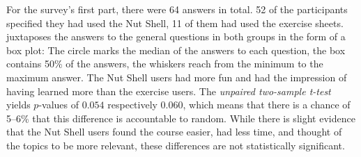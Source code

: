 \documentclass[paper=a4,twoside,abstract=on,cleardoublepage=empty,numbers=noenddot,toc=bib,toc=listof,12pt,appendixprefix=true]{scrreprt}
\begin{document}
For the survey's first part, there were 64 answers in total. 52 of the participants specified they had used the Nut Shell, 11 of them had used the exercise sheets.  juxtaposes the answers to the general questions in both groups in the form of a box plot: The circle marks the median of the answers to each question, the box contains 50\% of the answers, the whiskers reach from the minimum to the maximum answer. The Nut Shell users had more fun and had the impression of having learned more than the exercise users. The \emph{unpaired two-sample t-test} yields $p$-values of $0.054$ respectively $0.060$, which means that there is a chance of 5--6\% that this difference is accountable to random. While there is slight evidence that the Nut Shell users found the course easier, had less time, and thought of the topics to be more relevant, these differences are not statistically significant.
\end{document}
